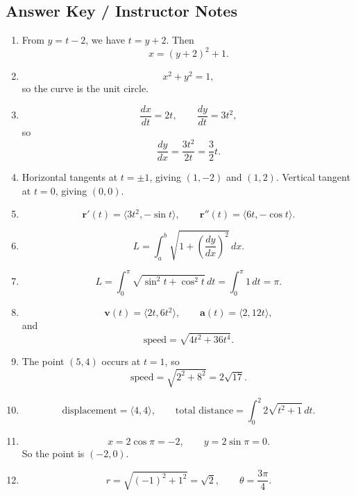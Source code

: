 \documentclass[11pt]{article}
\newcommand{\vect}[1]{\mathbf{#1}}
\begin{document}
\newpage
\subsection{Answer Key / Instructor Notes}

\begin{enumerate}
    \item From \(y=t-2\), we have \(t=y+2\). Then
    \[
    x=(y+2)^2+1.
    \]

    \item
    \[
    x^2+y^2=1,
    \]
    so the curve is the unit circle.

    \item
    \[
    \frac{dx}{dt}=2t,\qquad \frac{dy}{dt}=3t^2,
    \]
    so
    \[
    \frac{dy}{dx}=\frac{3t^2}{2t}=\frac32 t.
    \]

    \item Horizontal tangents at \(t=\pm 1\), giving \((1,-2)\) and \((1,2)\).  
    Vertical tangent at \(t=0\), giving \((0,0)\).

    \item
    \[
    \vect{r}'(t)=\langle 3t^2,-\sin t\rangle,\qquad
    \vect{r}''(t)=\langle 6t,-\cos t\rangle.
    \]

    \item
    \[
    L=\int_a^b \sqrt{1+\left(\frac{dy}{dx}\right)^2}\,dx.
    \]

    \item
    \[
    L=\int_0^\pi \sqrt{\sin^2 t+\cos^2 t}\,dt=\int_0^\pi 1\,dt=\pi.
    \]

    \item
    \[
    \vect{v}(t)=\langle 2t,6t^2\rangle,\qquad
    \vect{a}(t)=\langle 2,12t\rangle,
    \]
    and
    \[
    \text{speed}=\sqrt{4t^2+36t^4}.
    \]

    \item The point \((5,4)\) occurs at \(t=1\), so
    \[
    \text{speed}=\sqrt{2^2+8^2}=2\sqrt{17}.
    \]

    \item
    \[
    \text{displacement}=\langle 4,4\rangle,
    \qquad
    \text{total distance}=\int_0^2 2\sqrt{t^2+1}\,dt.
    \]

    \item
    \[
    x=2\cos\pi=-2,\qquad y=2\sin\pi=0.
    \]
    So the point is \((-2,0)\).

    \item
    \[
    r=\sqrt{(-1)^2+1^2}=\sqrt2,\qquad \theta=\frac{3\pi}{4}.
    \]


\end{enumerate}
\end{document}

